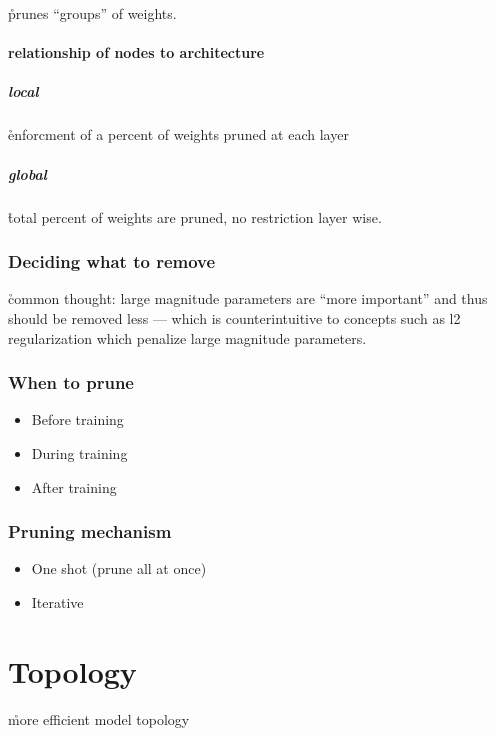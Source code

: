 \r{prunes ``groups'' of weights.}

\paragraph{relationship of nodes to architecture}

\subparagraph{local}

\r{enforcment of a percent of weights pruned at each layer}

\subparagraph{global}

\r{total percent of weights are pruned, no restriction layer wise.}

\subsubsection{Deciding what to remove}

\r{common thought: large magnitude parameters are ``more important'' and thus should be removed less --- which is counterintuitive to concepts such as l2 regularization which penalize large magnitude parameters.}


\subsubsection{When to prune}

\begin{itemize}[noitemsep,topsep=0pt]
	\item Before training
	\item During training
	\item After training
\end{itemize}

\subsubsection{Pruning mechanism}

\begin{itemize}[noitemsep,topsep=0pt]
	\item One shot (prune all at once)
	\item Iterative
\end{itemize}

\section{Topology}

\r{more efficient model topology}

